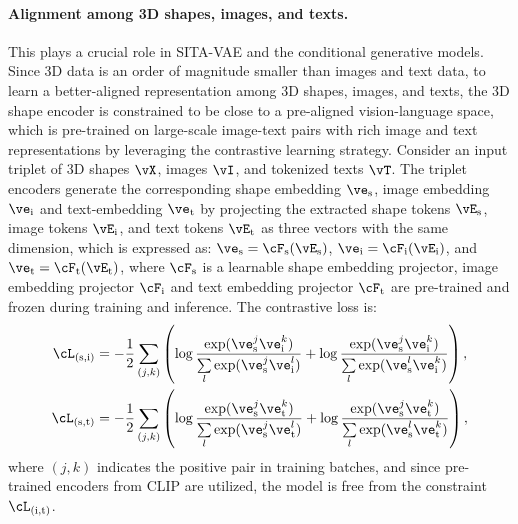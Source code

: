 \documentclass[../../book-main.tex]{subfiles}
\begin{document}
\paragraph{Alignment among 3D shapes, images, and texts.} This plays a crucial
role in SITA-VAE and the conditional generative models.
Since 3D data
is an order of magnitude smaller than images and text data, to learn
a better-aligned representation among 3D shapes, images, and texts,
the 3D shape encoder is constrained to be close to a pre-aligned
vision-language space, which is pre-trained on large-scale image-text
pairs with rich image and text representations by leveraging the
contrastive learning strategy.
Consider an input triplet of 3D shapes
\(\vX\), images \(\vI\), and tokenized texts \(\vT\).
The triplet encoders
generate the corresponding shape embedding \(\ve_{\mathrm{s}}\), image
embedding \(\ve_{\mathrm{i}}\) and text-embedding \(\ve_{\mathrm{t}}\) by
projecting the extracted shape tokens \(\vE_{\mathrm{s}}\), image
tokens \(\vE_{\mathrm{i}}\), and text tokens \(\vE_{\mathrm{t}}\) as three
vectors with the same dimension, which is expressed as:
\(\ve_{\mathrm{s}} = \cF_{\mathrm{s}}(\vE_{\mathrm{s}})\),
\(\ve_{\mathrm{i}} = \cF_{\mathrm{i}}(\vE_{\mathrm{i}})\), and
\(\ve_{\mathrm{t}} = \cF_{\mathrm{t}}(\vE_{\mathrm{t}})\),
where \(\cF_{\mathrm{s}}\) is a learnable shape embedding
projector, image embedding projector \(\cF_{\mathrm{i}}\) and
text embedding projector \(\cF_{\mathrm{t}}\) are pre-trained
and frozen during training and inference.
The contrastive loss is:
\begin{align}
    \cL_{(\mathrm{s},\mathrm{i})} &= - \frac{1}{2} \sum\limits_{(j,k)}
    \left(
        \log \frac{\exp (\ve_{\mathrm{s}}^j \ve_{\mathrm{i}}^k) }{
        \sum\limits_l \exp (\ve_{\mathrm{s}}^j \ve_{\mathrm{i}}^l) } +
        \log \frac{\exp (\ve_{\mathrm{s}}^j \ve_{\mathrm{i}}^k) }{
        \sum\limits_l \exp (\ve_{\mathrm{s}}^l \ve_{\mathrm{i}}^k) }
    \right) , \\
    \cL_{(\mathrm{s},\mathrm{t})}  &= - \frac{1}{2} \sum\limits_{(j,k)}
    \left(
        \log \frac{\exp (\ve_{\mathrm{s}}^j \ve_{\mathrm{t}}^k) }{
        \sum\limits_l \exp (\ve_{\mathrm{s}}^j \ve_{\mathrm{t}}^l) } +
        \log \frac{\exp (\ve_{\mathrm{s}}^j \ve_{\mathrm{t}}^k) }{
        \sum\limits_l \exp (\ve_{\mathrm{s}}^l \ve_{\mathrm{t}}^k) }
    \right) ,
\end{align}
where \((j,k)\) indicates the positive pair in training batches, and
since pre-trained encoders from CLIP are utilized, the model is free
from the constraint \(\cL_{(\mathrm{i}, \mathrm{t})}\).
\end{document}
